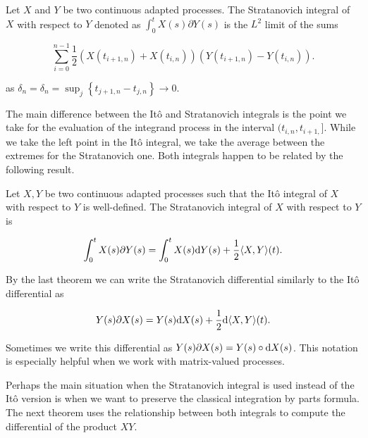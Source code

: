 \begin{definition}
    Let $X$ and $Y$ be two continuous adapted processes. The Stratanovich integral of $X$ with respect to $Y$ denoted as $\int_0^t X(s) \partial Y(s)$ is the $L^2$ limit of the sums

    \begin{equation*}
        \sum_{i=0}^{n-1} \frac12( X(t_{i+1,n}) + X(t_{i,n}))( Y(t_{i+1,n}) - Y(t_{i,n})).
    \end{equation*}

    \noindent as $\delta_n = \delta_n = \sup_j \left\{ t_{j+1,n} - t_{j,n} \right\} \to 0$.
\end{definition}

    The main difference between the Itô and Stratanovich integrals is the point we take for the evaluation of the integrand process in the interval $(t_{i,n},t_{i+1,}]$. While we take the left point in the Itô integral, we take the average between the extremes for the Stratanovich one. Both integrals happen to be related by the following result.

\begin{theorem}
    Let $X,Y$ be two continuous adapted processes such that the Itô integral of $X$ with respect to $Y$ is well-defined. The Stratanovich integral of $X$ with respect to $Y$ is 

    \begin{equation*}
        \int_0^t X(s) \partial Y(s) = \int_0^t X(s) \mathrm d Y (s) + \frac12 \langle X,Y\rangle (t).
    \end{equation*}
\end{theorem}

By the last theorem we can write the Stratanovich differential similarly to the Itô differential as

\begin{equation*}
    Y(s) \partial X(s) = Y(s) \mathrm d X(s) + \frac12 \mathrm d \langle X,Y \rangle (t).
\end{equation*}

Sometimes we write this differential as $Y(s) \partial X(s) = Y(s) \circ \mathrm d X(s)$. This notation is especially helpful when we work with matrix-valued processes.

Perhaps the main situation when the Stratanovich integral is used instead of the Itô version is when we want to preserve the classical integration by parts formula. The next theorem uses the relationship between both integrals to compute the differential of the product $XY$.

